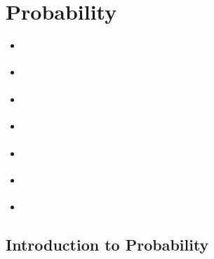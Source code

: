 \documentclass[letterpaper,10pt,english]{jupyterBook}
\begin{document}
\chapter{Probability}
\label{\detokenize{Ch3 Probability/3.0 Probability:probability}}\label{\detokenize{Ch3 Probability/3.0 Probability::doc}}\begin{itemize}
\item {} 
\sphinxAtStartPar
{\hyperref[\detokenize{Ch3 Probability/3.1 Introduction to Probability::doc}]{}}

\item {} 
\sphinxAtStartPar
{\hyperref[\detokenize{Ch3 Probability/3.2 Conditional Probability::doc}]{}}

\item {} 
\sphinxAtStartPar
{\hyperref[\detokenize{Ch3 Probability/3.3 Multiplication Rules and Independent Events::doc}]{}}

\item {} 
\sphinxAtStartPar
{\hyperref[\detokenize{Ch3 Probability/3.4 Addition Rules and Mutually Exclusive Events::doc}]{}}

\item {} 
\sphinxAtStartPar
{\hyperref[\detokenize{Ch3 Probability/3.5 Discrete Probability Distributions::doc}]{}}

\item {} 
\sphinxAtStartPar
{\hyperref[\detokenize{Ch3 Probability/3.6 The Binomial Distribution::doc}]{}}

\item {} 
\sphinxAtStartPar
{\hyperref[\detokenize{Ch3 Probability/3.7 Continuous Probability Distributions::doc}]{}}

\end{itemize}

\sphinxstepscope


\section{Introduction to Probability}
\label{\detokenize{Ch3 Probability/3.1 Introduction to Probability:introduction-to-probability}}\label{\detokenize{Ch3 Probability/3.1 Introduction to Probability::doc}}
\end{document}
